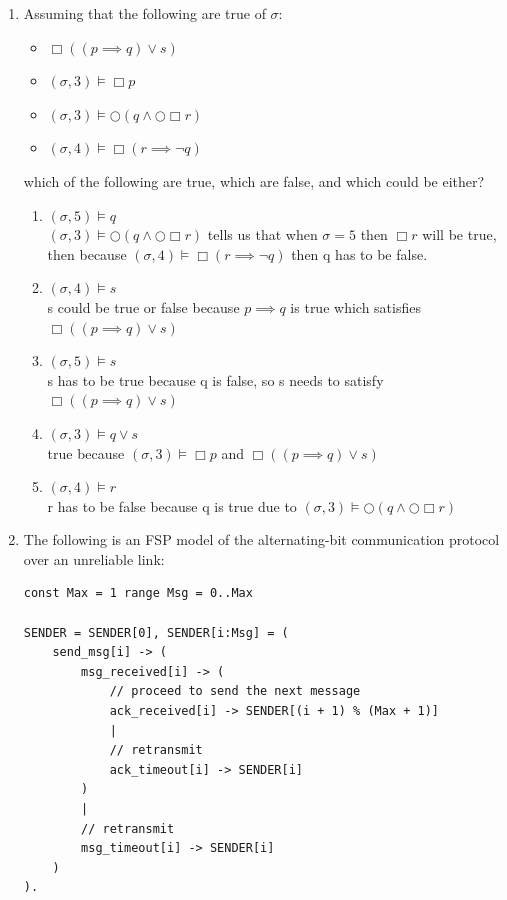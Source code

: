 \documentclass{article}
\newcommand{\Next}{\bigcirc}
\begin{document}
\begin{enumerate}
\begin{enumerate}
\end{enumerate}
\item Assuming that the following are true of $\sigma$:
\begin{itemize}
\item $\Box((p\implies q)\lor s)$
\item $(\sigma,3)\models\Box p $
\item $(\sigma,3)\models\Next(q\land\Next\Box r) $
\item $(\sigma,4)\models\Box(r\implies\neg q) $
\end{itemize}
which of the following are true, which are false, and which could be either?
\begin{enumerate}
\item $(\sigma,5)\models q$ \\
  $(\sigma,3)\models\Next(q\land\Next\Box r)$  tells us that when $\sigma = 5$ then $\Box r $ will be true, \\
  then because $(\sigma,4)\models\Box(r\implies\neg q) $ then q has to be false. 
 \item $(\sigma,4)\models s$ \\ s could be true or false because $p \implies q$ is true which satisfies $\Box((p\implies q)\lor s)$ \\
 \item $(\sigma,5)\models s$ \\
   s has to be true because q is false, so s needs to satisfy  $\Box((p\implies q)\lor s)$\\
\item $(\sigma,3)\models q\lor s$ \\
  true because $(\sigma,3)\models\Box p $ and  $\Box((p\implies q)\lor s)$ \\
\item $(\sigma,4)\models r$ \\
  r has to be false because q is true due to $(\sigma,3)\models\Next(q\land\Next\Box r) $ \\
\end{enumerate}


\item The following is an FSP model of the alternating-bit communication protocol
over an unreliable link:

\begin{small}
\begin{verbatim}
const Max = 1 range Msg = 0..Max

SENDER = SENDER[0], SENDER[i:Msg] = (
    send_msg[i] -> (
        msg_received[i] -> (
            // proceed to send the next message
            ack_received[i] -> SENDER[(i + 1) % (Max + 1)]
            |
            // retransmit
            ack_timeout[i] -> SENDER[i]
        )
        |
        // retransmit
        msg_timeout[i] -> SENDER[i]
    )
).


\end{verbatim}
\end{small}
\end{enumerate}
\end{document}
